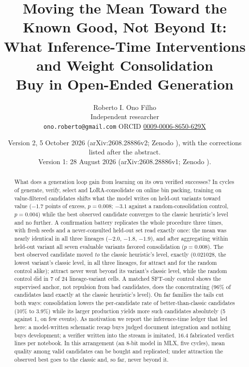 \documentclass[11pt]{article}
\title{Moving the Mean Toward the Known Good, Not Beyond It:\\ What Inference-Time Interventions and Weight Consolidation\\ Buy in Open-Ended Generation}
\author{Roberto I. Ono Filho\\ Independent researcher\\
\texttt{ono.roberto@gmail.com} \quad ORCID \href{https://orcid.org/0009-0006-8650-629X}{0009-0006-8650-629X}}
\date{\small Version 2, 5 October 2026 (arXiv:2608.28886v2; Zenodo \doilink{\thisdoi}), with the corrections listed after the abstract.\\ Version 1: 28 August 2026 (arXiv:2608.28886v1; Zenodo \doilink{10.5281/zenodo.22714136}).}
\begin{document}
\maketitle

\begin{abstract}
What does a generation loop gain from learning on its own verified
successes? In cycles of generate, verify, select and LoRA-consolidate on
online bin packing, training on value-filtered candidates shifts what
the model writes on held-out variants toward value ($-1.7$ points of
excess, $p=0.008$; $-3.1$ against a random-consolidation control,
$p=0.004$) while the best observed candidate converges to the classic
heuristic's level and no further. A
confirmation battery replicates the whole procedure three times, with
fresh seeds and a never-consulted held-out set read exactly once: the
mean was nearly identical in all three lineages ($-2.0$, $-1.8$, $-1.9$),
and after aggregating within held-out variant all seven evaluable
variants favored consolidation ($p=0.008$). The best observed candidate
moved \emph{to} the classic heuristic's level, exactly (0.021028, the
lowest variant's classic level, in all three lineages, for attract and
for the random control alike); attract never went beyond its variant's
classic level, while the random control did in 7 of 24 lineage-variant
cells. A matched SFT-only control shows
the supervised anchor, not repulsion from bad candidates, does the
concentrating (96\% of candidates land exactly at the classic
heuristic's level). On far families the tails cut both ways: consolidation lowers the
per-candidate rate of better-than-classic candidates (10\% to 3.9\%)
while its larger production yields more such candidates absolutely (5
against 1, on few events). As motivation we report the inference-time
ledger that led here: a model-written schematic recap buys judged
document integration and nothing buys development; a verifier written
into the stream is imitated, 16.4 fabricated verdict lines per notebook.
In this arrangement (an 8-bit model in MLX, five cycles), mean quality
among valid candidates can be bought and replicated; under attraction the
observed best goes to the classic and, so far, never beyond it.
\end{abstract}
\end{document}
